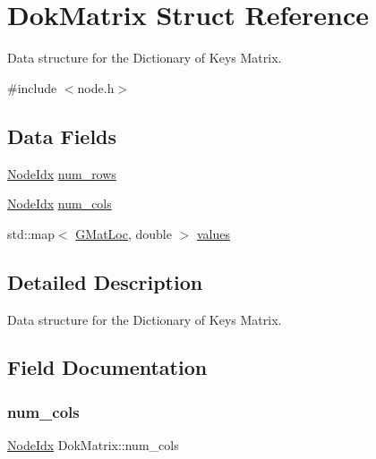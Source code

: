 \hypertarget{structDokMatrix}{}\section{Dok\+Matrix Struct Reference}
\label{structDokMatrix}


Data structure for the Dictionary of Keys Matrix.  




{\ttfamily \#include $<$node.\+h$>$}

\subsection*{Data Fields}
\begin{DoxyCompactItemize}
\item 
\hyperlink{node_8h_a5b622fe4354316a2f349615d150ae998}{Node\+Idx} \hyperlink{structDokMatrix_a653139601f15712d7fea0179d19824a1}{num\+\_\+rows}
\item 
\hyperlink{node_8h_a5b622fe4354316a2f349615d150ae998}{Node\+Idx} \hyperlink{structDokMatrix_a6d86fd874eb6e507f339699bc0764230}{num\+\_\+cols}
\item 
std\+::map$<$ \hyperlink{node_8h_aaffe095b1e5d88040e6ca3976576fccf}{G\+Mat\+Loc}, double $>$ \hyperlink{structDokMatrix_a1474a0133b470ffb7058cc88962046e6}{values}
\end{DoxyCompactItemize}


\subsection{Detailed Description}
Data structure for the Dictionary of Keys Matrix. 

\subsection{Field Documentation}
\mbox{\label{structDokMatrix_a6d86fd874eb6e507f339699bc0764230}} 
\subsubsection{\texorpdfstring{num\+\_\+cols}{num\_cols}}
{\footnotesize\ttfamily \hyperlink{node_8h_a5b622fe4354316a2f349615d150ae998}{Node\+Idx} Dok\+Matrix\+::num\+\_\+cols}

